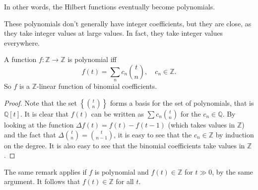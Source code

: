 In other words, the Hilbert functions eventually become polynomials. 

These polynomials don't generally have integer coefficients, but they are
close, as they take integer values at large values.
In fact, they take integer values everywhere.

\begin{remark} 
A function $f: \mathbb{Z} \to \mathbb{Z}$ is polynomial iff 
\[ f(t) = \sum_n c_n \binom{t}{n}, \quad c_n \in \mathbb{Z}.  \]
So $f$ is a $\mathbb{Z}$-linear function of binomial coefficients. 
\end{remark} 
\begin{proof} 
Note that the set $\left\{\binom{t}{n}\right\}$ forms a basis for the set of
polynomials, that is $\mathbb{Q}[t]$. It is clear that $f(t)$ can be written as
$\sum c_n \binom{t}{n}$ for the $c_n \in \mathbb{Q}$. By looking at the
function $\Delta f (t) = f(t) - f(t-1)$ (which takes values in $\mathbb{Z}$) and the fact that $\Delta \binom{t}{n}
= \binom{t}{n-1}$, it is easy to see that the $c_n \in \mathbb{Z}$ by induction
on the degree. 
It is also easy to see that the binomial coefficients take values in
$\mathbb{Z}$.
\end{proof} 

\begin{remark} 
The same remark applies if $f$ is polynomial and $f(t) \in \mathbb{Z}$ for $t
\gg 0$, by the same argument. It follows that $f(t) \in \mathbb{Z}$ for all $t$. 
\end{remark} 

